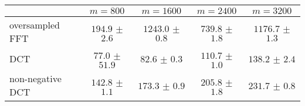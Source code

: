 \centering
\renewcommand{\arraystretch}{1.2}
\begin{tabular}{@{}lcccc@{}}
\toprule
 & $m=800$ & $m=1600$ & $m=2400$ & $m=3200$\\
\midrule
oversampled FFT & $194.9$ $\pm$ $2.6$ & $1243.0$ $\pm$ $0.8$ & $739.8$ $\pm$ $1.8$ & $1176.7$ $\pm$ $1.3$ \\
DCT & $77.0$ $\pm$ $51.9$ & $82.6$ $\pm$ $0.3$ & $110.7$ $\pm$ $1.0$ & $138.2$ $\pm$ $2.4$ \\
non-negative DCT & $142.8$ $\pm$ $1.1$ & $173.3$ $\pm$ $0.9$ & $205.8$ $\pm$ $1.8$ & $231.7$ $\pm$ $0.8$ \\
\bottomrule
\end{tabular}

